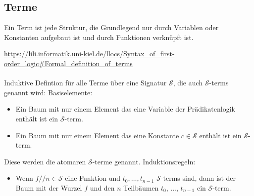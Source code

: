 \documentclass{article}
\begin{document}
    \subsection{Terme}
    \begin{tcolorbox}
        Ein Term ist jede Struktur, die Grundlegend nur durch Variablen oder Konstanten aufgebaut ist und durch Funktionen verknüpft ist.
    \end{tcolorbox}
    \url{https://lili.informatik.uni-kiel.de/llocs/Syntax_of_first-order_logic#Formal_definition_of_terms}\\\\
    Induktive Defintion für alle Terme über eine Signatur $\mathcal{S}$, die auch $\mathcal{S}$-terms genannt wird:
    Basiselemente:\\
    \begin{itemize}
        \item Ein Baum mit nur einem Element das eine Variable der Prädikatenlogik enthält ist ein $\mathcal{S}$-term.
        \item Ein Baum mit nur einem Element das eine Konstante $c \in \mathcal{S}$ enthält ist ein $\mathcal{S}$-term.
    \end{itemize}
    Diese werden die atomaren $\mathcal{S}$-terme genannt.
    Induktionsregeln:\\
    \begin{itemize}
        \item Wenn  $f/\!/n \in \mathcal S$ eine Funktion und $t_0, \dots, t_{n-1}$ $\mathcal S$-terms sind, dann ist der Baum mit der Wurzel $f$ und den $n$ Teilbäumen $t_0$, ..., $t_{n-1}$ ein $\mathcal S$-term.
    \end{itemize}
\end{document}
